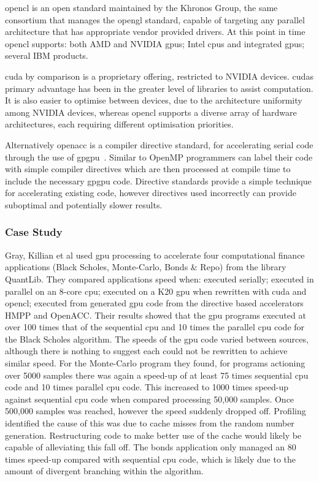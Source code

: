       \gls{opencl} is an open standard maintained by the Khronos Group, the same consortium that manages the \gls{opengl} standard, capable of targeting any parallel architecture that has appropriate vendor provided drivers. At this point in time \gls{opencl} supports: both AMD and NVIDIA \glspl{gpu}; Intel \glspl{cpu} and integrated \glspl{gpu}; several IBM products. 
        
      \gls{cuda} by comparison is a proprietary offering, restricted to NVIDIA devices. \glspl{cuda} primary advantage has been in the greater level of libraries to assist computation. It is also easier to optimise between devices, due to the architecture uniformity among NVIDIA devices, whereas \gls{opencl} supports a diverse array of hardware architectures, each requiring different optimisation priorities.
      
      Alternatively \gls{openacc} is a compiler directive standard, for accelerating serial code through the use of \gls{gpgpu}\ \cite{OPENACC}. Similar to OpenMP programmers can label their code with simple compiler directives which are then processed at compile time to include the necessary \gls{gpgpu} code. Directive standards provide a simple technique for accelerating existing code, however directives used incorrectly can provide suboptimal and potentially slower results.
      
    \subsubsection{Case Study}
      Gray, Killian et al \cite{GK*13} used \gls{gpu} processing to accelerate four computational finance applications (Black Scholes, Monte-Carlo, Bonds \& Repo) from the library QuantLib. They compared applications speed when: executed serially; executed in parallel on an 8-core \gls{cpu}; executed on a K20 \gls{gpu} when rewritten with \gls{cuda} and \gls{opencl}; executed from generated \gls{gpu} code from the directive based accelerators HMPP and OpenACC. Their results showed that the \gls{gpu} programs executed at over 100 times that of the sequential \gls{cpu} and 10 times the parallel \gls{cpu} code for the Black Scholes algorithm. The speeds of the \gls{gpu} code varied between sources, although there is nothing to suggest each could not be rewritten to achieve similar speed. For the Monte-Carlo program they found, for programs actioning over 5000 samples there was again a speed-up of at least 75 times sequential \gls{cpu} code and 10 times parallel \gls{cpu} code. This increased to 1000 times speed-up against sequential \gls{cpu} code when compared processing 50,000 samples. Once 500,000 samples was reached, however the speed suddenly dropped off. Profiling identified the cause of this was due to cache misses from the random number generation. Restructuring code to make better use of the cache would likely be capable of alleviating this fall off. The bonds application only managed an 80 times speed-up compared with sequential \gls{cpu} code, which is likely due to the amount of divergent branching within the algorithm.
      
